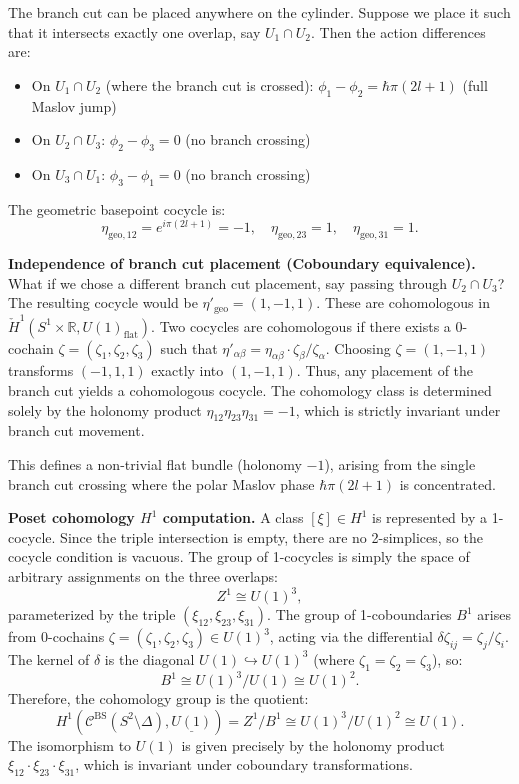 \documentclass[11pt]{article}
\begin{document}
The branch cut can be placed anywhere on the cylinder. Suppose we place it such
that it intersects exactly one overlap, say $U_1 \cap U_2$. Then the action differences are:
\begin{itemize}
\item On $U_1 \cap U_2$ (where the branch cut is crossed):
  $\phi_1 - \phi_2 = \hbar\pi(2l+1)$ (full Maslov jump)
\item On $U_2 \cap U_3$: $\phi_2 - \phi_3 = 0$ (no branch crossing)
\item On $U_3 \cap U_1$: $\phi_3 - \phi_1 = 0$ (no branch crossing)
\end{itemize}
The geometric basepoint cocycle is:
\[
\eta_{\mathrm{geo},12} = e^{i\pi(2l+1)} = -1, \quad
\eta_{\mathrm{geo},23} = 1, \quad
\eta_{\mathrm{geo},31} = 1.
\]

\textbf{Independence of branch cut placement (Coboundary equivalence).}
What if we chose a different branch cut placement, say passing through $U_2 \cap U_3$?
The resulting cocycle would be $\eta'_{\mathrm{geo}} = (1, -1, 1)$.
These are cohomologous in $\check{H}^1(S^1 \times \mathbb{R}, U(1)_{\mathrm{flat}})$.
Two cocycles are cohomologous if there exists a 0-cochain $\zeta = (\zeta_1, \zeta_2, \zeta_3)$
such that $\eta'_{\alpha\beta} = \eta_{\alpha\beta} \cdot \zeta_\beta/\zeta_\alpha$.
Choosing $\zeta = (1, -1, 1)$ transforms $(-1, 1, 1)$ exactly into $(1, -1, 1)$.
Thus, any placement of the branch cut yields a cohomologous cocycle.
The cohomology class is determined solely by the holonomy product
$\eta_{12}\eta_{23}\eta_{31} = -1$, which is strictly invariant under branch cut movement.

This defines a non-trivial flat bundle (holonomy $-1$), arising from the single
branch cut crossing where the polar Maslov phase $\hbar\pi(2l+1)$ is concentrated.

\textbf{Poset cohomology $H^1$ computation.}
A class $[\xi] \in H^1$ is represented by a 1-cocycle. Since the triple intersection is empty, there are no 2-simplices, so the cocycle condition is vacuous. The group of 1-cocycles is simply the space of arbitrary assignments on the three overlaps:
\[ Z^1 \cong U(1)^3, \]
parameterized by the triple $(\xi_{12}, \xi_{23}, \xi_{31})$.
The group of 1-coboundaries $B^1$ arises from 0-cochains $\zeta = (\zeta_1, \zeta_2, \zeta_3) \in U(1)^3$, acting via the differential $\delta\zeta_{ij} = \zeta_j/\zeta_i$. The kernel of $\delta$ is the diagonal $U(1) \hookrightarrow U(1)^3$ (where $\zeta_1=\zeta_2=\zeta_3$), so:
\[ B^1 \cong U(1)^3 / U(1) \cong U(1)^2. \]
Therefore, the cohomology group is the quotient:
\[
H^1(\mathcal{C}^{\mathrm{BS}}(S^2 \setminus \Delta), \underline{U(1)}) = Z^1 / B^1 \cong U(1)^3 / U(1)^2 \cong U(1).
\]
The isomorphism to $U(1)$ is given precisely by the holonomy product $\xi_{12} \cdot \xi_{23} \cdot \xi_{31}$, which is invariant under coboundary transformations.
\end{document}
